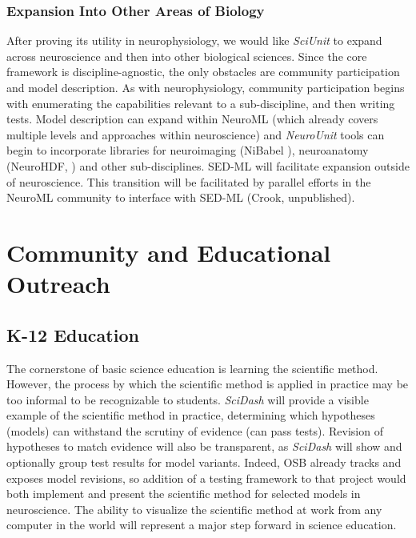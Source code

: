 \documentclass[11pt,letterpaper]{article}
\begin{document}
\subsubsection{Expansion Into Other Areas of Biology}
After proving its utility in neurophysiology, we would like \textit{SciUnit} to expand across neuroscience and then into other biological sciences.  Since the core framework is discipline-agnostic, the only obstacles are community participation and model description.  As with neurophysiology, community participation begins with enumerating the capabilities relevant to a sub-discipline, and then writing tests.  Model description can expand within NeuroML (which already covers multiple levels and approaches within neuroscience) and \textit{NeuroUnit} tools can begin to incorporate libraries for neuroimaging (NiBabel \cite{nibabel_url}), neuroanatomy (NeuroHDF, \cite{neurohdf_url}) and other sub-disciplines.  SED-ML \cite{hucka_systems_2003,sedml_url} will facilitate expansion outside of neuroscience.  This transition will be facilitated by parallel efforts in the NeuroML community to interface with SED-ML (Crook, unpublished).    

\section{Community and Educational Outreach}
\subsection{K-12 Education}
The cornerstone of basic science education is learning the scientific method.  However, the process by which the scientific method is applied in practice may be too informal to be recognizable to students.  \textit{SciDash} will provide a visible example of the scientific method in practice, determining which hypotheses (models) can withstand the scrutiny of evidence (can pass tests).  Revision of hypotheses to match evidence will also be transparent, as \textit{SciDash} will show and optionally group test results for model variants.  Indeed, OSB already tracks and exposes model revisions, so addition of a testing framework to that project would both implement and present the scientific method for selected models in neuroscience.  The ability to visualize the scientific method at work from any computer in the world will represent a major step forward in science education.  
\end{document}
